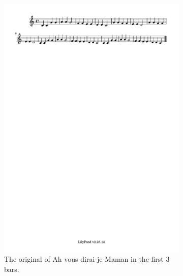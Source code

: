 \documentclass[11pt]{article}
\theoremstyle{definition}
\begin{document}
\begin{figure}
\centering
\begin{subfigure}{\textwidth}
  \centering
  \includegraphics[trim=1cm 26.5cm 10.055cm 0.02cm, clip, scale=0.8]{dabby_1.pdf} %
  \caption{The original of Ah vous dirai-je Maman in the first 3 bars.}
  \label{fig:Dabby1} 
\end{subfigure}
\begin{subfigure}{\textwidth}
  \centering

\end{subfigure}
\end{figure}
\end{document}

